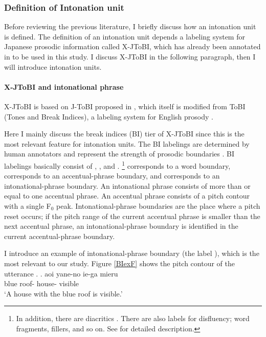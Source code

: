 \subsubsection{Definition of Intonation unit}

Before reviewing the previous literature,
I briefly discuss how an intonation unit is defined.
The definition of an intonation unit depends a labeling system for Japanese prosodic information called X-JToBI,
which has already been annotated in  to be used in this study.
I discuss X-JToBI in the following paragraph, then I will introduce intonation units.

\paragraph{X-JToBI and intonational phrase}

X-JToBI \cite{maekawaetal02,igarashietal06} is based on J-ToBI proposed in ,
which itself is modified from ToBI (Tones and Break Indices), a labeling system for English prosody \cite{silvermanetal92,pitrellietal94,beckmanelam97}.

Here I mainly discuss the break indices (BI) tier of X-JToBI
since this is the most relevant feature for intonation units.
The BI labelings are determined by human annotators and represent the strength of prosodic boundaries \cite{maekawaetal02,igarashietal06}.
BI labelings basically consist of , , and .%
	\footnote{
	In addition, there are diacritics .
	There are also labels for disfluency;
	word fragments, fillers, and so on.
	See  for detailed description.
	}
 corresponds to a word boundary,
 corresponds to an accentual-phrase boundary, and
 corresponds to an intonational-phrase boundary.
An intonational phrase consists of more than or equal to one accentual phrase.
An accentual phrase consists of a pitch contour with a single F$_{0}$ peak.
Intonational-phrase boundaries are the place where a pitch reset occurs;
if the pitch range of the current accentual phrase is smaller than the next accentual phrase,
an intonational-phrase boundary is identified in the current accentual-phrase boundary.

I introduce an example of intonational-phrase boundary (the label ),
which is the most relevant to our study.
Figure \ref{BIexF} shows the pitch contour of the utterance \Next.
%
\exg. aoi yane-no ie-ga mieru \\
	blue roof- house- visible \\
	`A house with the blue roof is visible.'

